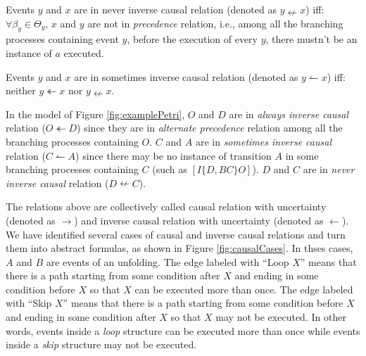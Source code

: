 \documentclass{llncs}
\begin{document}
\begin{definition}\label{def:neverInverseCausal}
Events $y$ and $x$ are in never inverse causal relation (denoted as $y\nleftarrow x$) iff: $\forall\beta_{y}\in\Theta_{y}$, $x$ and $y$ are not in \textit{precedence} relation, i.e., among all the branching processes containing event $y$, before the execution of every $y$, there mustn't be an instance of $a$ executed.
\end{definition}

\begin{definition}\label{def:sometimesInverseCausal}
Events $y$ and $x$ are in sometimes inverse causal relation (denoted as $y\leftharpoonup x$) iff: neither $y\twoheadleftarrow x$ nor $y\nleftarrow x$.
\end{definition}

\begin{example}
In the model of Figure \ref{fig:examplePetri}, $O$ and $D$ are in \textit{always inverse causal} relation ($O\twoheadleftarrow D$) since they are in \textit{alternate precedence} relation among all the branching processes containing $O$. $C$ and $A$ are in \textit{sometimes inverse causal} relation ($C\leftharpoonup A$) since there may be no instance of transition $A$ in some branching processes containing $C$ (such as $[I\{D,BC\}O]$). $D$ and $C$ are in \textit{never inverse causal} relation ($D\nleftarrow C$).
\end{example}

The relations above are collectively called causal relation with uncertainty (denoted as $\rightarrow$) and inverse causal relation with uncertainty (denoted as $\leftarrow $). We have identified several cases of causal and inverse causal relations and turn them into abstract formulas, as shown in Figure \ref{fig:causalCases}. In thses cases, $A$ and $B$ are events of an unfolding. The edge labeled with ``Loop $X$'' means that there is a path starting from some condition after $X$ and ending in some condition before $X$ so that $X$ can be executed more than once. The edge labeled with ``Skip $X$'' means that there is a path starting from some condition before $X$ and ending in some condition after $X$ so that $X$ may not be executed. In other words, events inside a \textit{loop} structure can be executed more than once while events inside a \textit{skip} structure may not be executed.
\end{document}
